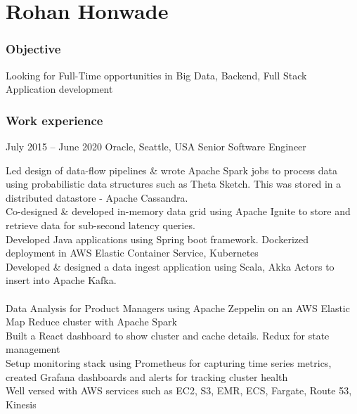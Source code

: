 \documentclass{tccv}
\begin{document}
\part{Rohan Honwade}

\section{Objective}
Looking for Full-Time opportunities in Big Data, Backend, Full Stack Application development

\section{Work experience}
\begin{eventlist}
\item{July 2015 -- June 2020}
     {Oracle, Seattle, USA}
     {Senior Software Engineer}

Led design of data-flow pipelines \& wrote Apache Spark jobs to process data using probabilistic data structures such as Theta Sketch. This was stored in a distributed datastore - Apache Cassandra.\\

Co-designed \& developed in-memory data grid using Apache Ignite to store and retrieve data for sub-second latency queries.\\

Developed Java applications using Spring boot framework. Dockerized deployment in AWS Elastic Container Service, Kubernetes\\

Developed \& designed a data ingest application using Scala, Akka Actors to insert into Apache Kafka.\\
\\

Data Analysis for Product Managers using Apache Zeppelin on an AWS Elastic Map Reduce cluster with Apache Spark\\

Built a React dashboard to show cluster and cache details. Redux for state management\\

Setup monitoring stack using Prometheus for capturing time series metrics, created Grafana dashboards and alerts for tracking cluster health\\

Well versed with AWS services such as EC2, S3, EMR, ECS, Fargate, Route 53, Kinesis


\end{eventlist}
\end{document}
